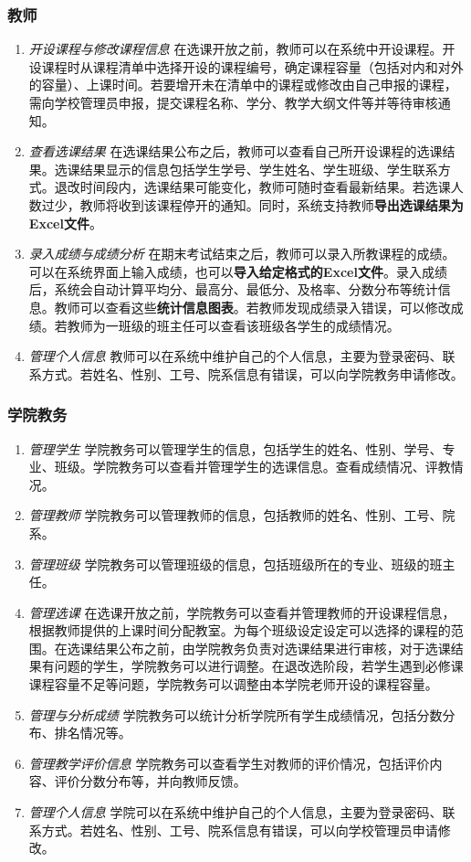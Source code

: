\subsubsection{教师}
\begin{enumerate}
    \item \textit{开设课程与修改课程信息} \quad 在选课开放之前，教师可以在系统中开设课程。开设课程时从课程清单中选择开设的课程编号，确定课程容量（包括对内和对外的容量）、上课时间。若要增开未在清单中的课程或修改由自己申报的课程，需向学校管理员申报，提交课程名称、学分、教学大纲文件等并等待审核通知。
    \item \textit{查看选课结果} \quad 在选课结果公布之后，教师可以查看自己所开设课程的选课结果。选课结果显示的信息包括学生学号、学生姓名、学生班级、学生联系方式。退改时间段内，选课结果可能变化，教师可随时查看最新结果。若选课人数过少，教师将收到该课程停开的通知。同时，系统支持教师\textbf{导出选课结果为Excel文件}。
    \item \textit{录入成绩与成绩分析} \quad 在期末考试结束之后，教师可以录入所教课程的成绩。可以在系统界面上输入成绩，也可以\textbf{导入给定格式的Excel文件}。录入成绩后，系统会自动计算平均分、最高分、最低分、及格率、分数分布等统计信息。教师可以查看这些\textbf{统计信息图表}。若教师发现成绩录入错误，可以修改成绩。若教师为一班级的班主任可以查看该班级各学生的成绩情况。
    \item \textit{管理个人信息} \quad 教师可以在系统中维护自己的个人信息，主要为登录密码、联系方式。若姓名、性别、工号、院系信息有错误，可以向学院教务申请修改。
\end{enumerate}

\subsubsection{学院教务}
\begin{enumerate}
    \item \textit{管理学生} \quad 学院教务可以管理学生的信息，包括学生的姓名、性别、学号、专业、班级。学院教务可以查看并管理学生的选课信息。查看成绩情况、评教情况。
    \item \textit{管理教师} \quad 学院教务可以管理教师的信息，包括教师的姓名、性别、工号、院系。
    \item \textit{管理班级} \quad 学院教务可以管理班级的信息，包括班级所在的专业、班级的班主任。
    \item \textit{管理选课} \quad 在选课开放之前，学院教务可以查看并管理教师的开设课程信息，根据教师提供的上课时间分配教室。为每个班级设定设定可以选择的课程的范围。在选课结果公布之前，由学院教务负责对选课结果进行审核，对于选课结果有问题的学生，学院教务可以进行调整。在退改选阶段，若学生遇到必修课课程容量不足等问题，学院教务可以调整由本学院老师开设的课程容量。
    \item \textit{管理与分析成绩} \quad 学院教务可以统计分析学院所有学生成绩情况，包括分数分布、排名情况等。
    \item \textit{管理教学评价信息} \quad 学院教务可以查看学生对教师的评价情况，包括评价内容、评价分数分布等，并向教师反馈。
    \item \textit{管理个人信息} \quad 学院可以在系统中维护自己的个人信息，主要为登录密码、联系方式。若姓名、性别、工号、院系信息有错误，可以向学校管理员申请修改。
\end{enumerate}

